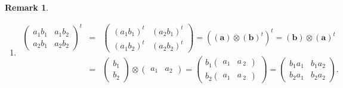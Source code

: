 \documentclass[aps,preprint]{revtex4}
\newtheorem{remark}[theorem]{Remark}
\begin{document}
\begin{remark}
\begin{enumerate}
\begin{enumerate}
\item 
\begin{eqnarray}
\left( 
\begin{array}{cc}
a_{1}b_{1} & a_{1}b_{2} \\ 
a_{2}b_{1} & a_{2}b_{2}%
\end{array}%
\right) ^{t} &=&\left( 
\begin{array}{cc}
\left( a_{1}b_{1}\right) ^{t} & \left( a_{2}b_{1}\right) ^{t} \\ 
\left( a_{1}b_{2}\right) ^{t} & \left( a_{2}b_{2}\right) ^{t}%
\end{array}%
\right) =\left( \overset{}{\left( \boldsymbol{a}\right) \otimes \left( 
\boldsymbol{b}\right) ^{t}}\right) ^{t}=\left( \boldsymbol{b}\right) \otimes
\left( \boldsymbol{a}\right) ^{t} \\
&=&\left( 
\begin{array}{c}
b_{1} \\ 
b_{2}%
\end{array}%
\right) \otimes \left( 
\begin{array}{cc}
a_{1} & a_{2}%
\end{array}%
\right) =\left( 
\begin{array}{c}
b_{1}\left( 
\begin{array}{cc}
a_{1} & a_{\ 2}%
\end{array}%
\right) \\ 
b_{2}\left( 
\begin{array}{cc}
a_{1} & a_{\ 2}%
\end{array}%
\right)%
\end{array}%
\right) =\left( 
\begin{array}{cc}
b_{1}a_{1} & b_{1}a_{2} \\ 
b_{2}a_{1} & b_{2}a_{2}%
\end{array}%
\right) .
\end{eqnarray}
\end{enumerate}
\end{enumerate}
\end{remark}
\end{document}
